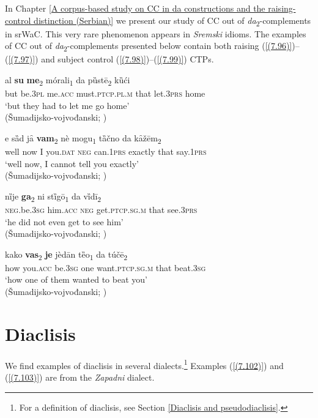 \noindent In Chapter \ref{A corpus-based study on CC in da constructions and the raising-control distinction (Serbian)} we present our study of CC out of \textit{da}\textsubscript{2}-complements in srWaC. This very rare phenomenon appears in \textit{Sremski} idioms. The examples of CC out of \textit{da}\textsubscript{2}-complements presented below contain both raising (\ref{(7.96)})--(\ref{(7.97)}) and subject control (\ref{(7.98)})--(\ref{(7.99)}) CTPs.

\begin{exe}\ex\label{(7.96)}
		\gll al  \textbf{su}  \textbf{me}\textsubscript{2}  mórali\textsubscript{1}  da  pȕstē\textsubscript{2}  kȕći  \\
		but be.3\textsc{pl}  me.\textsc{acc}  must.\textsc{ptcp.pl.m} that  let.3\textsc{prs}  home \\
		\glt ‘but they had to let me go home’ \\
	\hfill  (Šumadijsko-vojvođanski; \citealt[368]{Nikolic64})

	\ex\label{(7.97)}
		\gll e  sȁd  jȃ  \textbf{vam}\textsubscript{2}  nè  mogu\textsubscript{1}  tȁčno  da  kȃžēm\textsubscript{2}  \\
		well now I you.\textsc{dat}  \textsc{neg} can.1\textsc{prs} exactly that  say.1\textsc{prs}\\
		\glt ‘well now, I cannot tell you exactly’ \\
	\hfill  (Šumadijsko-vojvođanski; \citealt[368]{Nikolic64})

	\ex\label{(7.98)}
		\gll nȉje  \textbf{ga}\textsubscript{2}  ni  stȉgō\textsubscript{1}  da  vȉdī\textsubscript{2}  \\
		\textsc{neg}.be.3\textsc{sg}  him.\textsc{acc}  \textsc{neg} get\textsc{.ptcp.sg.m} that  see\textsc{.3prs} \\
		\glt ‘he did not even get to see him’ \\
	\hfill  (Šumadijsko-vojvođanski; \citealt[368]{Nikolic64})

	\ex\label{(7.99)}
		\gll kako  \textbf{vas}\textsubscript{2}  \textbf{je}  jèdān  tȅo\textsubscript{1}  da  túčē\textsubscript{2}  \\
		how you.\textsc{acc} be.3\textsc{sg}  one want.\textsc{ptcp.sg.m} that  beat.3\textsc{sg} \\
		\glt ‘how one of them wanted to beat you’ \\
	\hfill  (Šumadijsko-vojvođanski; \citealt[368]{Nikolic64})
\end{exe}

\section{Diaclisis}
\label{Diaclisis:8}
We find examples of diaclisis in several dialects.\footnote{For a definition of diaclisis, see Section \ref{Diaclisis and pseudodiaclisis}.} Examples (\ref{(7.102)}) and (\ref{(7.103)}) are from the \textit{Zapadni} dialect.

